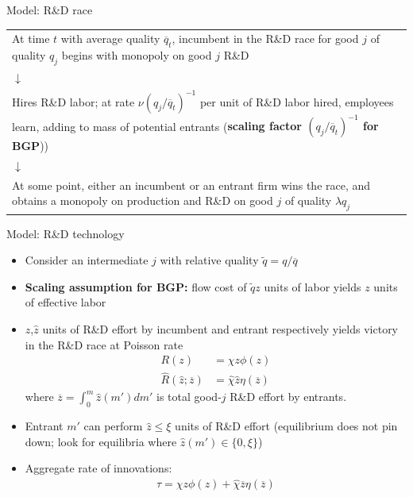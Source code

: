 \documentclass[english,usenames,dvipsnames]{beamer}
\begin{document}
\begin{frame}{Model: R\&D race}
\begin{table}
	\begin{tabular}{p{}}
		\centering
		At time $t$ with average quality $\overline{q}_t$, incumbent in the R\&D race for good $j$ of quality $q_j$ begins with monopoly on good $j$ R\&D \\
		$\downarrow$\\
		Hires R\&D labor; at rate $\nu (q_j/\overline{q}_t)^{-1}$ per unit of R\&D labor hired, employees learn, adding to mass of potential entrants (\textbf{scaling factor $(q_j/\overline{q}_t)^{-1}$ for BGP})) \\
		$\downarrow$\\
		At some point, either an incumbent or an entrant firm wins the race, and obtains a monopoly on production and R\&D on good $j$ of quality $\lambda q_j$
	\end{tabular}
\end{table}
\end{frame}

\begin{frame}{Model: R\&D technology}
\begin{itemize}
	\small
	\item Consider an intermediate $j$ with relative quality $\tilde{q} = q / \overline{q}$
	\item \textbf{Scaling assumption for BGP:} flow cost of $\tilde{q}z$ units of labor yields $z$ units of effective labor 
	\item $z$,$\hat{z}$ units of R\&D effort by incumbent and entrant respectively yields victory in the R\&D race at Poisson rate
	\begin{align*}
	R(z) &= \chi z \phi(z) \\
	\hat{R}(\hat{z};\overline{z}) &= \hat{\chi} \hat{z} \eta(\overline{z}) 
	\end{align*}
	where $\overline{z} = \int_0^{m} \hat{z}(m')dm'$ is total good-$j$ R\&D effort by entrants.
	\item Entrant $m'$ can perform $\hat{z}\le\xi$ units of R\&D effort (equilibrium does not pin down; look for equilibria where $\hat{z}(m') \in \{0,\xi \}$)
	\item Aggregate rate of innovations:
	\begin{align*}
	\tau = \chi z \phi(z) + \hat{\chi} \overline{z} \eta(\overline{z})
	\end{align*}
\end{itemize}
\end{frame}
\end{document}
